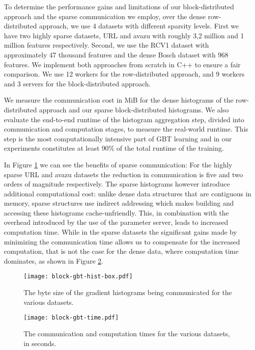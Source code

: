 To determine the performance gains and limitations of our block-distributed approach and
the sparse communication we employ, over the dense row-distributed approach,
we use 4 datasets with different sparsity levels. First
we have two highly sparse datasets, URL and avazu with roughly 3,2 million and
1 million features respectively. Second, we use the RCV1 dataset with approximately
47 thousand features and the dense Bosch dataset with 968 features.
We implement both approaches from scratch in C++ to ensure a fair comparison.
We use 12 workers for the row-distributed approach, and 9 workers and 3
servers for the block-distributed approach.

We measure the
communication cost in MiB for the dense histograms of the row-distributed approach
and our sparse block-distributed histograms. We also evaluate the end-to-end runtime
of the histogram aggregation step, divided into communication and computation stages,
to measure the real-world runtime. This step is the most computationally intensive
part of GBT learning \cite{comm-efficient-gbt} and in our experiments constitutes
at least 90\% of the total runtime of the training.

In Figure \ref{fig:block-gbt-hist-size} we can see the benefits of sparse communication:
For the highly sparse URL and avazu datasets the reduction in communication is five and
two orders of magnitude respectively. The sparse histograms however introduce additional computational
cost: unlike dense data structures that are contiguous in memory, sparse structures use
indirect addressing which makes building and accessing these histograms cache-unfriendly.
This, in combination with the overhead introduced by the use of the parameter server,
leads to increased computation time.
While in the sparse datasets the significant gains made by minimizing the communication time
allows us to compensate for the increased computation, that is not the case for
the dense data, where computation time dominates, as shown in Figure \ref{fig:block-gbt-time}.


\begin{figure}
	\centering
	\texttt{[image: block-gbt-hist-box.pdf]}
	\vspace{-10pt}
	\caption{The byte size of the gradient histograms being communicated for the various datasets.}
	\label{fig:block-gbt-hist-size}
\end{figure}

\begin{figure}
	\centering
	\texttt{[image: block-gbt-time.pdf]}
	\vspace{-10pt}
	\caption{The communication and computation times for the various datasets, in seconds.}
	\label{fig:block-gbt-time}
\end{figure}


